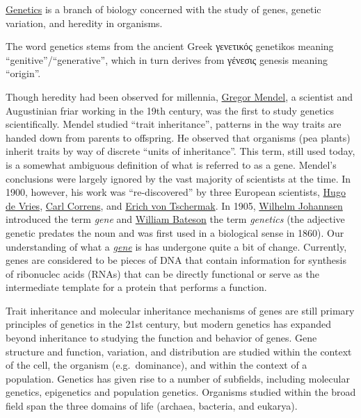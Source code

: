 \href{https://en.wikipedia.org/wiki/Genetics}{Genetics} is a branch of biology concerned with the study of genes, genetic variation, and heredity in organisms.

The word genetics stems from the ancient Greek γενετικός genetikos meaning ``genitive''/``generative'', which in turn derives from γένεσις genesis meaning ``origin''.

Though heredity had been observed for millennia, \href{https://en.wikipedia.org/wiki/Gregor_Mendel}{Gregor Mendel}, a scientist and Augustinian friar working in the 19th century, was the first to study genetics scientifically. Mendel studied ``trait inheritance'', patterns in the way traits are handed down from parents to offspring. He observed that organisms (pea plants) inherit traits by way of discrete ``units of inheritance''. This term, still used today, is a somewhat ambiguous definition of what is referred to as a gene. Mendel's conclusions were largely ignored by the vast majority of scientists at the time. In 1900, however, his work was ``re-discovered'' by three European scientists, \href{https://en.wikipedia.org/wiki/Hugo_de_Vries}{Hugo de Vries}, \href{https://en.wikipedia.org/wiki/Carl_Correns}{Carl Correns}, and \href{https://en.wikipedia.org/wiki/Erich_von_Tschermak}{Erich von Tschermak}. In 1905, \href{https://en.wikipedia.org/wiki/Wilhelm_Johannsen}{Wilhelm Johannsen} introduced the term \emph{gene} and \href{https://en.wikipedia.org/wiki/William_Bateson}{William Bateson} the term \emph{genetics} (the adjective genetic predates the noun and was first used in a biological sense in 1860). Our understanding of what a \href{https://en.wikipedia.org/wiki/Gene\#Discovery_of_discrete_inherited_units}{\emph{gene}} is has undergone quite a bit of change. Currently, genes are considered to be pieces of DNA that contain information for synthesis of ribonuclec acids (RNAs) that can be directly functional or serve as the intermediate template for a protein that performs a function.

Trait inheritance and molecular inheritance mechanisms of genes are still primary principles of genetics in the 21st century, but modern genetics has expanded beyond inheritance to studying the function and behavior of genes. Gene structure and function, variation, and distribution are studied within the context of the cell, the organism (e.g.~dominance), and within the context of a population. Genetics has given rise to a number of subfields, including molecular genetics, epigenetics and population genetics. Organisms studied within the broad field span the three domains of life (archaea, bacteria, and eukarya).

